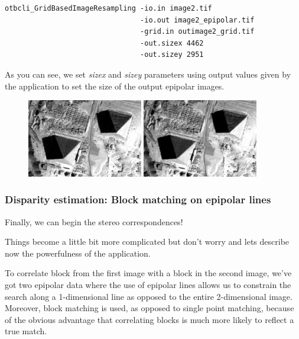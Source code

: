 \begin{verbatim}
otbcli_GridBasedImageResampling -io.in image2.tif
                                -io.out image2_epipolar.tif
                                -grid.in outimage2_grid.tif
                                -out.sizex 4462
                                -out.sizey 2951
\end{verbatim}

As you can see, we set \textit{sizex} and \textit{sizey} parameters using output values given by
the  application to set the size
of the output epipolar images.

\begin{figure}[!h]
  \center
  \includegraphics[width=0.45\textwidth]{../Art/MonteverdiImages/stereo_image1_epipolar.png}
  \includegraphics[width=0.45\textwidth]{../Art/MonteverdiImages/stereo_image2_epipolar.png}
  \label{fig:MeanShiftVectorImageFilter}
\end{figure}

\subsubsection{Disparity estimation: Block matching on epipolar lines}

Finally, we can begin the stereo correspondences!

Things become a little bit more complicated but don't worry and lets describe
now the powerfulness of the  application.

To correlate block from the first image with a block in the second image, we've
got two epipolar data where the use of epipolar lines allows us to constrain the
search along a 1-dimensional line as opposed to the entire 2-dimensional
image. Moreover, block matching is used, as opposed to single point matching,
because of the obvious advantage that correlating blocks is much more likely to
reflect a true match.

